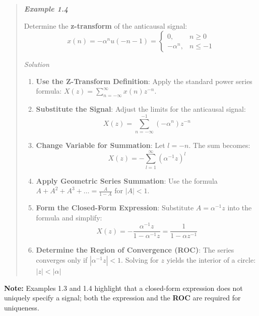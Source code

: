 \begin{quote}
\textbf{\emph{Example 1.4}}

Determine the \textbf{z-transform} of the anticausal signal: \[
x(n) = -\alpha^n u(-n-1) =
\begin{cases} 0, & n \ge 0 \\
-\alpha^n, & n \le -1 
\end{cases}
\]

\emph{Solution}

\begin{enumerate}
\def\labelenumi{\arabic{enumi}.}
\tightlist
\item
  \textbf{Use the Z-Transform Definition}: Apply the standard power
  series formula: \(X(z) = \sum_{n=-\infty}^{\infty} x(n)z^{-n}\).
\item
  \textbf{Substitute the Signal}: Adjust the limits for the anticausal
  signal: \[X(z) = \sum_{n=-\infty}^{-1} (-\alpha^n) z^{-n}\]
\item
  \textbf{Change Variable for Summation}: Let \(l = -n\). The sum
  becomes: \[X(z) = -\sum_{l=1}^{\infty} (\alpha^{-1} z)^l\]
\item
  \textbf{Apply Geometric Series Summation}: Use the formula
  \(A + A^2 + A^3 + \dots = \frac{A}{1-A}\) for \(|A| < 1\).
\item
  \textbf{Form the Closed-Form Expression}: Substitute
  \(A = \alpha^{-1} z\) into the formula and simplify:
  \[X(z) = -\frac{\alpha^{-1} z}{1 - \alpha^{-1} z} = {\frac{1}{1 - \alpha z^{-1}}}\]
\item
  \textbf{Determine the Region of Convergence (ROC)}: The series
  converges only if \(|\alpha^{-1} z| < 1\). Solving for \(z\) yields
  the interior of a circle: \textbf{\(|z| < |\alpha|\)}
\end{enumerate}
\end{quote}

\textbf{Note:} Examples 1.3 and 1.4 highlight that a closed-form
expression does not uniquely specify a signal; both the expression and
the \textbf{ROC} are required for uniqueness.

